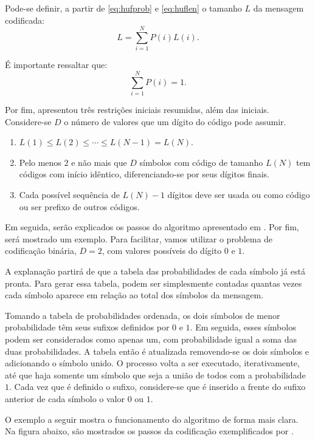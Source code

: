 \documentclass[cic,tc]{iiufrgs}
\begin{document}
Pode-se definir, a partir de \eqref{eq:hufprob} e \eqref{eq:huflen} o tamanho $L$ da mensagem 
codificada:
\begin{equation*}
    L = \sum_{i=1}^N {P(i)L(i)}.
\end{equation*}

É importante ressaltar que:
\begin{equation*}
    \sum_{i=1}^N {P(i)} = 1.
\end{equation*}

Por fim, \citet{HuffmanCoding} apresentou três restrições iniciais resumidas, além das iniciais.
Considere-se $D$ o número de valores que um dígito do código pode assumir.
\begin{enumerate}
    \item $L(1) \le L(2) \le \cdots \le L(N-1) = L(N)$.
    \item Pelo menos $2$ e não mais que $D$ símbolos com código de tamanho $L(N)$ tem códigos 
    com início idêntico, diferenciando-se por seus dígitos finais.
    \item Cada possível sequência de $L(N)-1$ dígitos deve ser usada ou como código ou ser 
    prefixo de outros códigos.
\end{enumerate}

Em seguida, serão explicados os passos do algoritmo apresentado em \citet{HuffmanCoding}.
Por fim, será mostrado um exemplo.
Para facilitar, vamos utilizar o problema de codificação binária, $D=2$, com valores 
possíveis do dígito $0$ e $1$.

A explanação partirá de que a tabela das probabilidades de cada símbolo já está pronta.
Para gerar essa tabela, podem ser simplesmente contadas quantas vezes cada símbolo aparece
em relação ao total dos símbolos da mensagem.

Tomando a tabela de probabilidades ordenada, os dois símbolos de menor probabilidade 
têm seus sufixos definidos por $0$ e $1$.
Em seguida, esses símbolos podem ser considerados como apenas um, com probabilidade igual 
a soma das duas probabilidades. 
A tabela então é atualizada removendo-se os dois símbolos e adicionando o símbolo unido. 
O processo volta a ser executado, iterativamente, até que haja somente um símbolo que seja 
a união de todos com a probabilidade $1$.
Cada vez que é definido o sufixo, considere-se que é inserido a frente do sufixo anterior 
de cada símbolo o valor $0$ ou $1$.

O exemplo a seguir mostra o funcionamento do algoritmo de forma mais clara.
Na figura abaixo, são mostrados os passos da codificação exemplificados por 
\citet{HuffmanCoding}.
\end{document}
